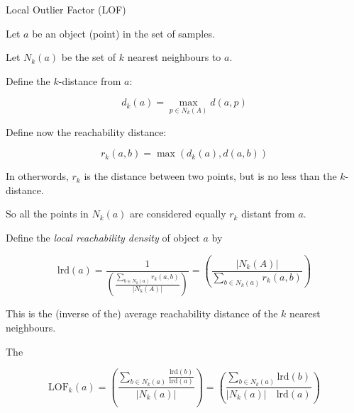 
\begin{frame}{Local Outlier Factor (LOF)}
   {
    Let $a$ be an object (point) in the set of samples.

    Let $N_k(a)$ be the set of $k$ nearest neighbours to $a$.

    Define the $k$-distance from $a$:

    \begin{displaymath}
      d_k(a) = \max_{p\in N_k(A)} d(a, p)
    \end{displaymath}
  }
   {
    Define now the reachability distance:

    \begin{displaymath}
      r_k(a, b) = \max (d_k(a), d(a, b))
    \end{displaymath}

    In otherwords, $r_k$ is the distance between two points, but is no
    less than the $k$-distance.

    So all the points in $N_k(a)$ are considered equally $r_k$ distant
    from $a$.

    \bigskip
  }
   {
    Define the \textit{local reachability density} of object $a$ by

    \begin{displaymath}
      \mbox{lrd}(a) = \frac{1}{\left(
          \frac{
            \sum\limits_{b\in N_k(a)} r_k(a, b)
          }
          {|N_k(A)|}
        \right)}
      =
      \left(
      \frac
      {|N_k(A)|}
      {
        \displaystyle\sum_{b\in N_k(a)} r_k(a, b)
      }
      \right)
    \end{displaymath}

    This is the (inverse of the) average reachability distance of the
    $k$ nearest neighbours.
  }
   {
    The

    \begin{displaymath}
      \mbox{LOF}_k(a) = \left(
        \frac
        {\sum_{b\in N_k(a)} \frac{\mbox{lrd}(b)}{\mbox{lrd}(a)}}
        {|N_k(a)|}
        \right)
        =
        \left(
          \frac
          {\sum_{b\in N_k(a)} \mbox{lrd}(b)}
          {|N_k(a)|\quad \mbox{lrd}(a)}
        \right)
      \end{displaymath}

}
\end{frame}
